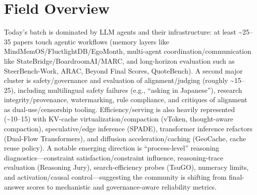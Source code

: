 \documentclass[12pt,letterpaper]{article}
\begin{document}
\medskip



\section*{Field Overview}
{\footnotesize Today's batch is dominated by LLM agents and their infrastructure: at least \textasciitilde{}25--35 papers touch agentic workflows (memory layers like MindMemOS/FluctlightDB/EgoMonth, multi-agent coordination/communication like StateBridge/BoardroomAI/MARC, and long-horizon evaluation such as SteerBench-Work, ARAC, Beyond Final Scores, QuoteBench). A second major cluster is safety/governance and evaluation of alignment/judging (roughly \textasciitilde{}15--25), including multilingual safety failures (e.g., ``asking in Japanese''), research integrity/provenance, watermarking, rule compliance, and critiques of alignment as dual-use/censorship tooling. Efficiency/serving is also heavily represented (\textasciitilde{}10--15) with KV-cache virtualization/compaction (vToken, thought-aware compaction), speculative/edge inference (SPADE), transformer inference refactors (Dual-Flow Transformers), and diffusion acceleration/caching (GeoCache, cache reuse policy). A notable emerging direction is ``process-level'' reasoning diagnostics---constraint satisfaction/constraint influence, reasoning-trace evaluation (Reasoning Jury), search-efficiency probes (TsuGO), numeracy limits, and activation/causal control---suggesting the community is shifting from final-answer scores to mechanistic and governance-aware reliability metrics.}
\end{document}
